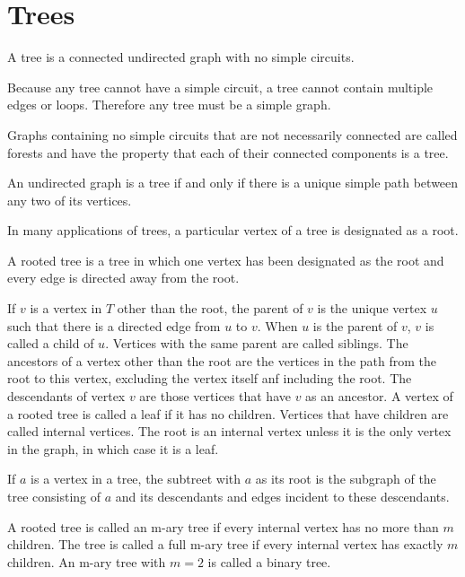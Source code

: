 \documentclass[../discrete.tex]{subfiles}
\begin{document}
\chapter{Trees}
\begin{definition}
    A tree is a connected undirected graph with no simple circuits.
\end{definition}

Because any tree cannot have a simple circuit, a tree cannot contain multiple edges or loops. Therefore any tree must be a simple graph.

Graphs containing no simple circuits that are not necessarily connected are called forests and have the property
that each of their connected components is a tree.

\begin{theorem}
    An undirected graph is a tree if and only if there is a unique simple path between any two of its vertices.
\end{theorem}

In many applications of trees, a particular vertex of a tree is designated as a root.

\begin{definition}
    A rooted tree is a tree in which one vertex has been designated as the root and every edge is directed away from the root.
\end{definition}

If $v$ is a vertex in $T$ other than the root, the parent of $v$ is the unique vertex $u$ such that there is a directed edge from $u$ to $v$.
When $u$ is the parent of $v$, $v$ is called a child of $u$. Vertices with the same parent are called siblings. The ancestors of a vertex 
other than the root are the vertices in the path from the root to this vertex, excluding the vertex itself anf including the root.
The descendants of vertex $v$ are those vertices that have $v$ as an ancestor. A vertex of a rooted tree is called a leaf 
if it has no children. Vertices that have children are called internal vertices. The root is an internal vertex unless it is the only vertex in the graph, in which case it is a leaf.

If $a$ is a vertex in a tree, the subtreet with $a$ as its root is the subgraph of the tree consisting of $a$ and its descendants and edges incident to these descendants.

\begin{definition}
    A rooted tree is called an m-ary tree if every internal vertex has no more than $m$ children. The tree is called a full m-ary tree if every 
    internal vertex has exactly $m$ children. An m-ary tree with $m=2$ is called a binary tree.
\end{definition}
\end{document}
